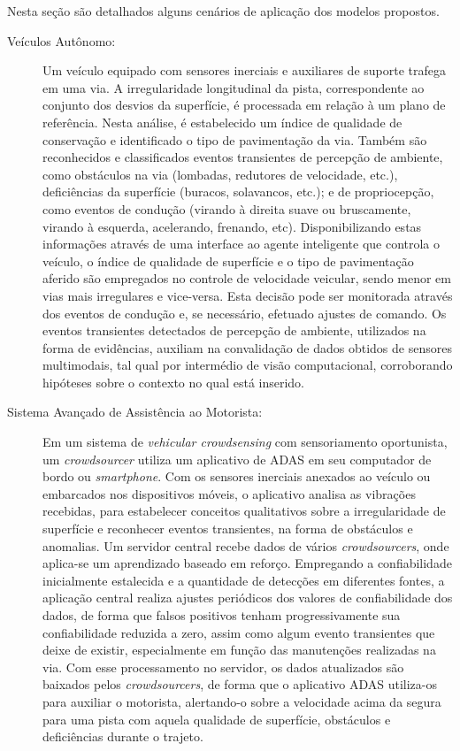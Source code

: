 Nesta seção são detalhados alguns cenários de aplicação dos modelos propostos.

\begin{description}

\item [Veículos Autônomo:] Um veículo equipado com sensores inerciais e auxiliares de suporte trafega em uma via. A irregularidade longitudinal da pista, correspondente ao conjunto dos desvios da superfície, é processada em relação à um plano de referência. Nesta análise, é estabelecido um índice de qualidade de conservação e identificado o tipo de pavimentação da via. Também são reconhecidos e classificados eventos transientes de percepção de ambiente, como obstáculos na via (lombadas, redutores de velocidade, etc.), deficiências da superfície (buracos, solavancos, etc.); e de propriocepção, como eventos de condução (virando à direita suave ou bruscamente, virando à esquerda, acelerando, frenando, etc). Disponibilizando estas informações através de uma interface ao agente inteligente que controla o veículo, o índice de qualidade de superfície e o tipo de pavimentação aferido são empregados no controle de velocidade veicular, sendo menor em vias mais irregulares e vice-versa. Esta decisão pode ser monitorada através dos eventos de condução e, se necessário, efetuado ajustes de comando. Os eventos transientes detectados de percepção de ambiente, utilizados na forma de evidências, auxiliam na convalidação de dados obtidos de sensores multimodais, tal qual por intermédio de visão computacional, corroborando hipóteses sobre o contexto no qual está inserido.

\item [Sistema Avançado de Assistência ao Motorista:] Em um sistema de \textit{vehicular crowdsensing} com sensoriamento oportunista, um \textit{crowdsourcer} utiliza um aplicativo de ADAS em seu computador de bordo ou \textit{smartphone}. Com os sensores inerciais anexados ao veículo ou embarcados nos dispositivos móveis, o aplicativo analisa as vibrações recebidas, para estabelecer conceitos qualitativos sobre a irregularidade de superfície e reconhecer eventos transientes, na forma de obstáculos e anomalias. Um servidor central recebe dados de vários \textit{crowdsourcers}, onde aplica-se um aprendizado baseado em reforço. Empregando a confiabilidade inicialmente estalecida e a quantidade de detecções em diferentes fontes, a aplicação central realiza ajustes periódicos dos valores de confiabilidade dos dados, de forma que falsos positivos tenham progressivamente sua confiabilidade reduzida a zero, assim como algum evento transientes que deixe de existir, especialmente em função das manutenções realizadas na via. Com esse processamento no servidor, os dados atualizados são baixados pelos \textit{crowdsourcers}, de forma que o aplicativo ADAS utiliza-os para auxiliar o motorista, alertando-o sobre a velocidade acima da segura para uma pista com aquela qualidade de superfície, obstáculos e deficiências durante o trajeto.


\end{description}
